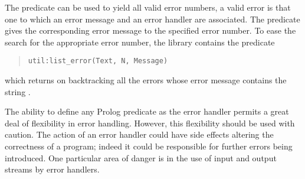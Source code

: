 The predicate
can be used to yield all valid error numbers, a valid error is that one
to which an error message and an error handler are associated.
The predicate 
gives the corresponding error message to the specified error number.
To ease the search for the appropriate error number,
the library  contains the predicate
\begin{quote}
\begin{verbatim}
util:list_error(Text, N, Message)
\end{verbatim}
\end{quote}
which returns on backtracking all the errors whose error message
contains the string .

The ability to define any Prolog predicate as the error handler permits a
great deal of flexibility in error handling. However, this flexibility
should be used with caution. The action of an error handler could have side
effects altering the correctness of a program; indeed it could be responsible
for further errors being introduced. One particular area of danger is in the
use of input and output streams by error handlers.


